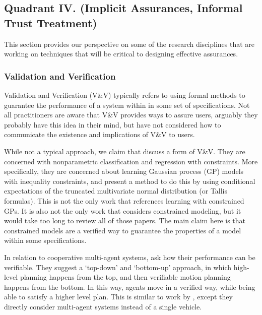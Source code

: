 \subsection{Quadrant IV. (Implicit Assurances, Informal Trust Treatment)}\label{sec:q4}
This section provides our perspective on some of the research disciplines that are working on techniques that will be critical to designing effective assurances.

\subsubsection{Validation and Verification}

Validation and Verification (V\&V) typically refers to using formal methods to guarantee the performance of a system within in some set of specifications. Not all practitioners are aware that V\&V provides ways to assure users, arguably they probably have this idea in their mind, but have not considered how to communicate the existence and implications of V\&V to users.

    While not a typical approach, we claim that \citet{Da_Veiga2012-gh} discuss a form of V\&V. They are concerned with nonparametric classification and regression with constraints. More specifically, they are concerned about learning Gaussian process (GP) models with inequality constraints, and present a method to do this by using conditional expectations of the truncated multivariate normal distribution (or Tallis formulas). This is not the only work that references learning with constrained GPs. It is also not the only work that considers constrained modeling, but it would take too long to review all of those papers. The main claim here is that constrained models are a verified way to guarantee the properties of a model within some specifications. 

    In relation to cooperative multi-agent systems, \citet{Da_Silva2016-qb} ask how their performance can be verifiable. They suggest a `top-down' and `bottom-up' approach, in which high-level planning happens from the top, and then verifiable motion planning happens from the bottom. In this way, agents move in a verified way, while being able to satisfy a higher level plan. This is similar to work by \citet{Conner2007-uw}, except they directly consider multi-agent systems instead of a single vehicle. 

